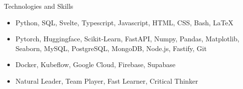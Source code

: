 \documentclass[]{mcdowellcv}
\begin{document}
	\begin{cvsection}{Technologies and Skills}
		\begin{cvsubsection}{}{}{}	
			\begin{itemize}
				\item Python, SQL, Svelte, Typescript, Javascript, HTML, CSS, Bash, \LaTeX
				\item Pytorch, Huggingface, Scikit-Learn, FastAPI, Numpy, Pandas, Matplotlib, Seaborn, MySQL, PostgreSQL, MongoDB, Node.js, Fastify, Git
				\item Docker, Kubeflow, Google Cloud, Firebase, Supabase
				\item Natural Leader, Team Player, Fast Learner, Critical Thinker
			\end{itemize}
		\end{cvsubsection}
	\end{cvsection}
	
\end{document}
